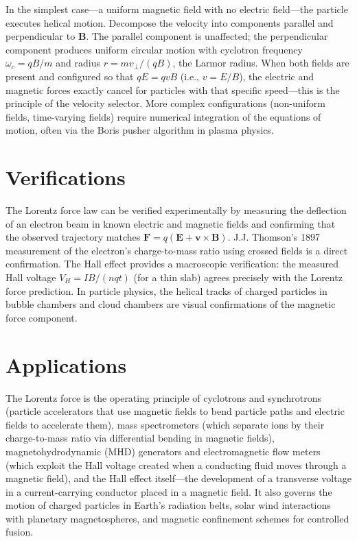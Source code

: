\documentclass[11pt,openright]{book}
\begin{document}
In the simplest case---a uniform magnetic field with no electric field---the particle executes helical motion. Decompose the velocity into components parallel and perpendicular to $\mathbf{B}$. The parallel component is unaffected; the perpendicular component produces uniform circular motion with cyclotron frequency $\omega_c = qB/m$ and radius $r = mv_\perp / (qB)$, the Larmor radius. When both fields are present and configured so that $qE = qvB$ (i.e., $v = E/B$), the electric and magnetic forces exactly cancel for particles with that specific speed---this is the principle of the velocity selector. More complex configurations (non-uniform fields, time-varying fields) require numerical integration of the equations of motion, often via the Boris pusher algorithm in plasma physics.
\section*{Verifications}

The Lorentz force law can be verified experimentally by measuring the deflection of an electron beam in known electric and magnetic fields and confirming that the observed trajectory matches $\mathbf{F} = q(\mathbf{E} + \mathbf{v}\times\mathbf{B})$. J.J. Thomson's 1897 measurement of the electron's charge-to-mass ratio using crossed fields is a direct confirmation. The Hall effect provides a macroscopic verification: the measured Hall voltage $V_H = IB/(nqt)$ (for a thin slab) agrees precisely with the Lorentz force prediction. In particle physics, the helical tracks of charged particles in bubble chambers and cloud chambers are visual confirmations of the magnetic force component.
\section*{Applications}

The Lorentz force is the operating principle of cyclotrons and synchrotrons (particle accelerators that use magnetic fields to bend particle paths and electric fields to accelerate them), mass spectrometers (which separate ions by their charge-to-mass ratio via differential bending in magnetic fields), magnetohydrodynamic (MHD) generators and electromagnetic flow meters (which exploit the Hall voltage created when a conducting fluid moves through a magnetic field), and the Hall effect itself---the development of a transverse voltage in a current-carrying conductor placed in a magnetic field. It also governs the motion of charged particles in Earth's radiation belts, solar wind interactions with planetary magnetospheres, and magnetic confinement schemes for controlled fusion.
\end{document}
